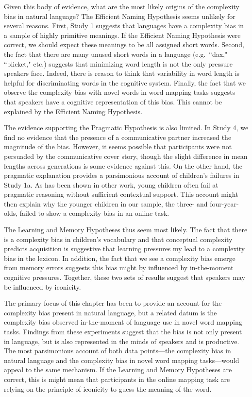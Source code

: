 Given this body of evidence, what are the most likely origins of the complexity bias in natural language? The Efficient Naming Hypothesis seems unlikely for several reasons. First, Study 1 suggests that languages have a complexity bias in a  sample of highly primitive meanings. If the Efficient Naming Hypothesis were correct, we should expect these meanings to be all assigned short words. Second, the fact that there are many unused short words in a language (e.g.\ ``dax," ``blicket," etc.) suggests that minimizing word length is not the only pressure speakers face. Indeed, there is reason to think that variability in word length is helpful for discriminating words in the cognitive system. Finally, the fact that we observe the complexity bias with novel words in word mapping tasks suggests that speakers have a cognitive representation of this bias. This cannot be explained by the Efficient Naming Hypothesis.

The evidence supporting the Pragmatic Hypothesis is also limited. In Study 4, we find no evidence that the presence of a communicative partner increased the magnitude of the bias. However, it seems possible that participants were not persuaded by the communicative cover story, though the slight difference in mean lengths across generations is some evidence against this. On the other hand, the pragmatic explanation provides a parsimonious account of children's failures in Study 1a. As has been shown in other work, young children often fail at pragmatic reasoning without sufficient contextual support. This account might then explain why the younger children in our sample, the three- and four-year-olds, failed to show a complexity bias in an online task. 

The Learning and Memory Hypotheses thus seem most likely. The fact that there is a complexity bias in children's vocabulary and that conceptual complexity predicts acquisition is suggestive that learning pressures my lead to a complexity bias in the lexicon. In addition, the fact that we see a complexity bias emerge from memory errors suggests this bias might by influenced by in-the-moment cognitive pressures. Together, these two sets of results suggest that speakers may be influenced by iconicity.

The primary focus of this chapter has been to provide an account for the complexity bias present in natural language, but a related datum is the complexity bias observed in-the-moment of language use in novel word mapping tasks. Findings from these experiments suggest that the bias is not only present in language, but is also represented in the minds of speakers and is productive. The most parsimonious account of both data points---the complexity bias in natural language and the complexity bias in novel word mapping tasks---would appeal to the same mechanism. If the Learning and Memory Hypotheses are correct, this is might mean that participants in the online mapping task are relying on the principle of iconicity to guess the meaning of the word. 

